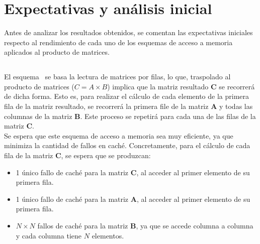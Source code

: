\pagestyle{fancy}
\fancyhead[l]{\autorUO}
\fancyfoot[l]{\asignaturaAbbr}
\fancyfoot[r]{\fecha}

\section{Expectativas y análisis inicial} \label{sec:2}
Antes de analizar los resultados obtenidos, se comentan las expectativas iniciales respecto al rendimiento de cada uno de 
los esquemas de acceso a memoria aplicados al producto de matrices.

\subsection{\rowmajor}
El esquema \rowmajor\ se basa la lectura de matrices por filas, lo que, traspolado al producto de matrices (\( C = A \times B \))
implica que la matriz resultado \textbf{C} se recorrerá de dicha forma. Esto es, para realizar el cálculo de cada elemento de la primera fila de la matriz 
resultado, se recorrerá la primera file de la matriz \textbf{A} y todas las columnas de la matriz \textbf{B}. Este proceso se repetirá para cada una 
de las filas de la matriz \textbf{C}. \\
Se espera que este esquema de acceso a memoria sea muy eficiente, ya que minimiza la cantidad de fallos en caché. Concretamente, 
para el cálculo de cada fila de la matriz \textbf{C}, se espera que se produzcan:
\begin{itemize}
    \item 1 único fallo de caché para la matriz \textbf{C}, al acceder al primer elemento de su primera fila.
    \item 1 único fallo de caché para la matriz \textbf{A}, al acceder al primer elemento de su primera fila.
    \item \(N \times N\) fallos de caché para la matriz \textbf{B}, ya que se accede columna a columna y cada columna tiene \(N\) elementos.
\end{itemize}

